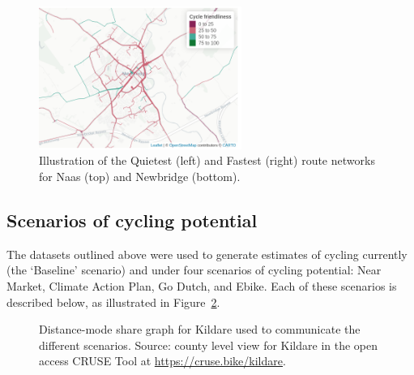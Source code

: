 \documentclass[
  super,
  preprint,
  3p]{elsarticle}
\begin{document}
\begin{figure}
%
\begin{minipage}{0.50\linewidth}
\includegraphics[width=2.60417in,height=\textheight]{images/newbridge_fastest_godutch.png}\end{minipage}%

\caption{\label{fig-route-types}Illustration of the Quietest (left) and
Fastest (right) route networks for Naas (top) and Newbridge (bottom).}

\end{figure}%

\subsection{Scenarios of cycling potential}\label{sec-scenarios}

The datasets outlined above were used to generate estimates of cycling
currently (the `Baseline' scenario) and under four scenarios of cycling
potential: Near Market, Climate Action Plan, Go Dutch, and Ebike. Each
of these scenarios is described below, as illustrated in
Figure~\ref{fig-scenarios}.

\begin{figure}


\caption{\label{fig-scenarios}Distance-mode share graph for Kildare used
to communicate the different scenarios. Source: county level view for
Kildare in the open access CRUSE Tool at
\url{https://cruse.bike/kildare}.}

\end{figure}%
\end{document}
